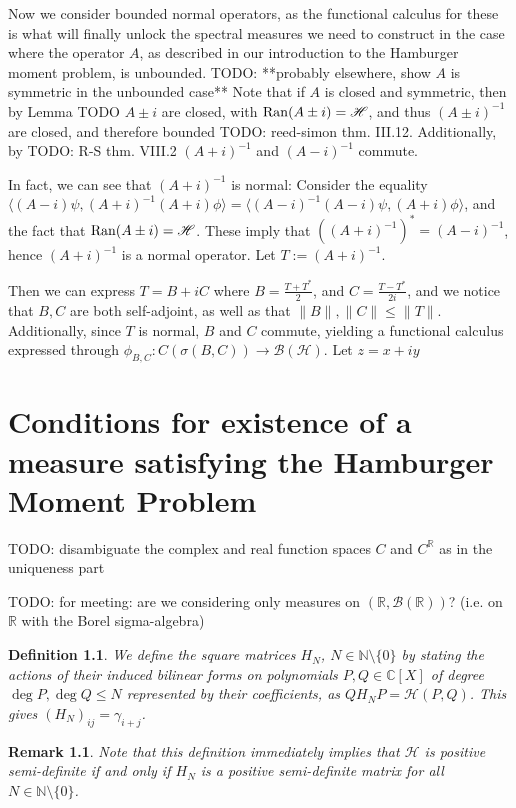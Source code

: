 \documentclass[12pt,oneside]{report}
\newtheorem{defn}[thm]{Definition}
\newtheorem{rem}[thm]{Remark}
\begin{document}
Now we consider bounded normal operators, as the functional calculus for these is what will finally unlock the spectral measures we need to construct in the case where the operator $A$, as described in our introduction to the Hamburger moment problem, is unbounded. TODO: **probably elsewhere, show $A$ is symmetric in the unbounded case** Note that if $A$ is closed and symmetric, then by Lemma TODO $A \pm i$ are closed, with $\mathrm{Ran}(A \pm i) = \mathscr{H}$, and thus $(A \pm i)^{-1}$ are closed, and therefore bounded TODO: reed-simon thm. III.12. Additionally, by TODO: R-S thm. VIII.2 $(A+i)^{-1}$ and $(A-i)^{-1}$ commute.

In fact, we can see that $(A+i)^{-1}$ is normal: Consider the equality $\langle (A - i)\psi, (A+i)^{-1}(A+i)\phi \rangle = \langle (A-i)^{-1}(A-i)\psi, (A+i)\phi \rangle$, and the fact that $\mathrm{Ran}(A \pm i) = \mathscr{H}$. These imply that $((A+i)^{-1})^{*} = (A-i)^{-1}$, hence $(A+i)^{-1}$ is a normal operator. Let $T := (A+i)^{-1}$.

Then we can express $T = B + iC$ where $B = \frac{T + T^{*}}{2}$, and $C = \frac{T - T^{*}}{2i}$, and we notice that $B,C$ are both self-adjoint, as well as that $\|B\|, \|C\| \leq \|T\|$. Additionally, since $T$ is normal, $B$ and $C$ commute, yielding a functional calculus expressed through $\phi_{B,C}: C(\sigma(B,C)) \to \mathscr{B}(\mathscr{H})$. Let $z = x + iy$

\chapter{Conditions for existence of a measure satisfying the Hamburger Moment Problem}

TODO: disambiguate the complex and real function spaces $C$ and $C^{\mathbb{R}}$ as in the uniqueness part

TODO: for meeting: are we considering only measures on $(\mathbb{R}, \mathcal{B}(\mathbb{R}))$? (i.e. on $\mathbb{R}$ with the Borel sigma-algebra)

\begin{defn}
    We define the square matrices $H_{N}$, $N \in \mathbb{N} \setminus \{ 0 \}$ by stating the actions of their induced bilinear forms on polynomials $P, Q \in \mathbb{C}[X]$ of degree $\deg P, \deg Q \leq N$ represented by their coefficients, as $QH_{N}P = \mathcal{H}(P,Q)$. This gives $(H_{N})_{ij} = \gamma_{i+j}$.
\end{defn}

\begin{rem}
    Note that this definition immediately implies that $\mathcal{H}$ is positive semi-definite if and only if $H_{N}$ is a positive semi-definite matrix for all $N \in \mathbb{N} \setminus \{ 0 \}$.
\end{rem}
\end{document}
